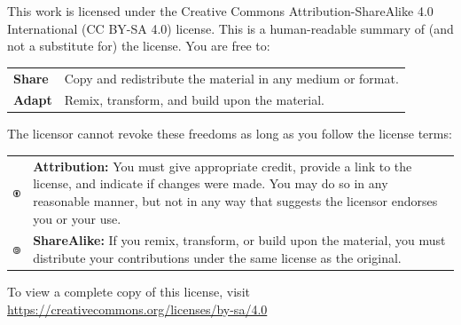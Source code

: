    \noindent This work is licensed under the Creative Commons Attribution-ShareAlike 4.0 International (CC BY-SA 4.0) license. This is a human-readable summary of (and not a substitute for) the license. You are free to:
    
    \noindent
    \begin{tabular}{m{1.5cm} m{13.5cm}}
        \textbf{Share} & Copy and redistribute the material in any medium or format.\\
        \textbf{Adapt} & Remix, transform, and build upon the material.\\
    \end{tabular}
    
    \vspace{1mm}
    
    \noindent The licensor cannot revoke these freedoms as long as you follow the license terms:
    
    \noindent
    \begin{tabular}{m{1.5cm} m{13.5cm}}
        \includegraphics[width=2em]{opening/resources/license/by.pdf} & \textbf{Attribution:} You must give appropriate credit, provide a link to the license, and indicate if changes were made. You may do so in any reasonable manner, but not in any way that suggests the licensor endorses you or your use.\\
        \includegraphics[width=2em]{opening/resources/license/sa.pdf} & \textbf{ShareAlike:} If you remix, transform, or build upon the material, you must distribute your contributions under the same license as the original.
    \end{tabular}
    
    \noindent To view a complete copy of this license, visit 
    \href{https://creativecommons.org/licenses/by-nc-sa/4.0/}{https://creativecommons.org/licenses/by-sa/4.0}

\endgroup



\begingroup

    \renewcommand{\baselinestretch}{0.9}\footnotesize  %
    
